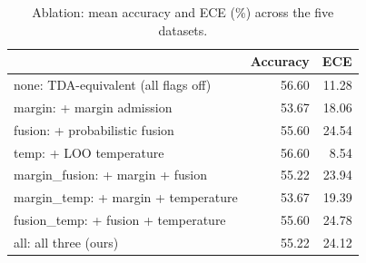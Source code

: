 \begin{table}[htbp]
\centering
\begin{tabular}{lrr}
\toprule
 & Accuracy & ECE \\
\midrule
none: TDA-equivalent (all flags off) & 56.60 & 11.28 \\
margin: + margin admission & 53.67 & 18.06 \\
fusion: + probabilistic fusion & 55.60 & 24.54 \\
temp: + LOO temperature & 56.60 & 8.54 \\
margin\_fusion: + margin + fusion & 55.22 & 23.94 \\
margin\_temp: + margin + temperature & 53.67 & 19.39 \\
fusion\_temp: + fusion + temperature & 55.60 & 24.78 \\
all: all three (ours) & 55.22 & 24.12 \\
\bottomrule
\end{tabular}
\caption{Ablation: mean accuracy and ECE (\%) across the five datasets.}
\label{tab:ablation}
\end{table}
